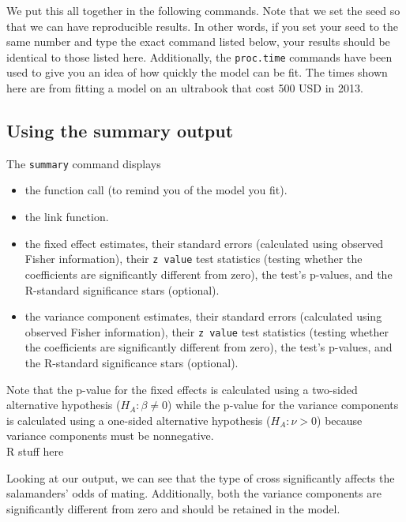 \documentclass[article]{jss}
\begin{document}

We put this all together in the following commands. Note that we set the seed so that we can have reproducible results. In other words, if you set your seed to the same number and type the exact command listed below, your results should be identical to those listed here. Additionally, the \texttt{proc.time} commands have been used to give you an idea of how quickly the model can be fit. The times shown here are from fitting a model on an ultrabook that cost 500 USD in 2013. 


\subsection{Using the summary output}
The \texttt{summary} command displays
\begin{itemize}
\item the function call (to remind you of the model you fit).
\item the link function.
\item the fixed effect estimates, their standard errors (calculated using observed Fisher information), their \texttt{z value} test statistics (testing whether the coefficients are significantly different from zero), the test's p-values, and the R-standard significance stars (optional).
\item the variance component estimates, their standard errors (calculated using observed Fisher information), their \texttt{z value} test statistics (testing whether the coefficients are significantly different from zero), the test's p-values, and the R-standard significance stars (optional).
\end{itemize}



Note that the p-value for the fixed effects is calculated using a two-sided alternative hypothesis ($H_A: \beta \neq 0$) while the p-value for the variance components is calculated using a one-sided alternative hypothesis ($H_A: \nu >0$) because variance components must be nonnegative.\\


R stuff here

Looking at our output, we can see that the type of cross significantly affects the salamanders' odds of mating. Additionally, both the variance components are significantly different from zero and should be retained in the model.\\
\end{document}
